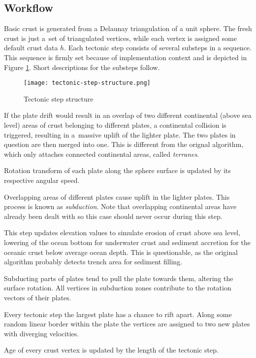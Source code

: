 \subsection{Workflow}
Basic crust is generated from a Delaunay triangulation of a unit sphere. The fresh crust is just a~set of triangulated vertices, while each vertex is assigned some default crust data $h$. Each tectonic step consists of several substeps in a sequence. This sequence is firmly set because of implementation context and is depicted in Figure \ref{fig:tectonic-step-structure}. Short descriptions for the substeps follow.
\begin{figure}[ht]
\centering
\texttt{[image: tectonic-step-structure.png]}
\caption{Tectonic step structure}
\label{fig:tectonic-step-structure}
\end{figure}
\begin{itemize}[\label={}]
\item[\textbf{Continental collisions}] If the plate drift would result in an overlap of two different continental (above sea level) areas of crust belonging to different plates, a continental collision is triggered, resulting in a~massive uplift of the lighter plate. The two plates in question are then merged into one. This is different from the orignal algorithm, which only attaches connected continental areas, called \textit{terranes}.
\item[\textbf{Plate drift}] Rotation transform of each plate along the sphere surface is updated by its respective angular speed.
\item[\textbf{Subduction uplift}] Overlapping areas of different plates cause uplift in the lighter plates. This process is known as \textit{subduction}. Note that overlapping continental areas have already been dealt with so this case should never occur during this step.
\item[\textbf{Continental erosion, oceanic damping, sediment accretion}] This step updates elevation values to simulate erosion of crust above sea level, lowering of the ocean bottom for underwater crust and sediment accretion for the oceanic crust below average ocean depth. This is questionable, as the original algorithm probably detects trench area for sediment filling.
\item[\textbf{Slab pull}] Subducting parts of plates tend to pull the plate towards them, altering the surface rotation. All vertices in subduction zones contribute to the rotation vectors of their plates.
\item[\textbf{Plate rifting}] Every tectonic step the largest plate has a chance to rift apart. Along some random linear border within the plate the vertices are assigned to two new plates with diverging velocities.
\item[\textbf{Crust aging}] Age of every crust vertex is updated by the length of the tectonic step.
\end{itemize}
